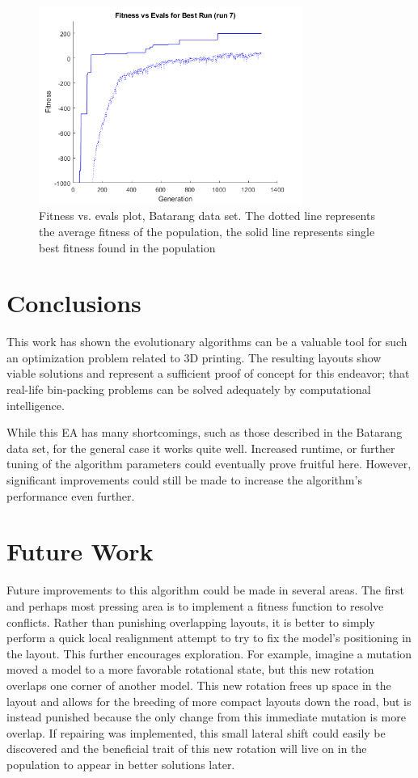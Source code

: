 \documentclass[conference]{IEEEtran}
\begin{document}
\begin{figure}[ht]
\centering
\includegraphics[width=3.4in]{dataset_batarang/fitness_vs_evals.png}
\caption{Fitness vs. evals plot, Batarang data set. The dotted line represents the average fitness of the population, the solid line represents single best fitness found in the population}
\label{fig:batarang_fitness_vs_evals}
\end{figure}

\section{Conclusions}
This work has shown the evolutionary algorithms can be a valuable tool for such an optimization problem related to 3D printing. The resulting layouts show viable solutions and represent a sufficient proof of concept for this endeavor; that real-life bin-packing problems can be solved adequately by computational intelligence.

While this EA has many shortcomings, such as those described in the Batarang data set, for the general case it works quite well. Increased runtime, or further tuning of the algorithm parameters could eventually prove fruitful here. However, significant improvements could still be made to increase the algorithm's performance even further.

\section{Future Work}
Future improvements to this algorithm could be made in several areas. The first and perhaps most pressing area is to implement a fitness function to resolve conflicts. Rather than punishing overlapping layouts, it is better to simply perform a quick local realignment attempt to try to fix the model's positioning in the layout. This further encourages exploration. For example, imagine a mutation moved a model to a more favorable rotational state, but this new rotation overlaps one corner of another model. This new rotation frees up space in the layout and allows for the breeding of more compact layouts down the road, but is instead punished because the only change from this immediate mutation is more overlap. If repairing was implemented, this small lateral shift could easily be discovered and the beneficial trait of this new rotation will live on in the population to appear in better solutions later.
\end{document}
